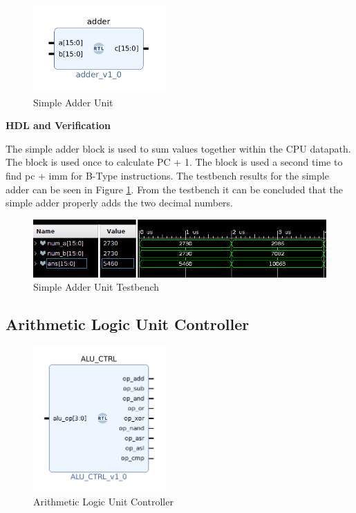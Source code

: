 \documentclass{article}
\newcommand{\stitle}{HDL and Verification}
\begin{document}
\begin{par}
	\begin{figure}[H]
		\centering
		\includegraphics[width=2in]{img/simpleAddr.png}
		\caption{Simple Adder Unit}
	\end{figure}
	
	\textbf{\stitle}
	\begin{par}
		The simple adder block is used to sum values together within the CPU datapath. The block is used once to calculate PC + 1. The block is used a second time to find pc + imm for B-Type instructions. The testbench results for the simple adder can be seen in Figure \ref{fig:addrfig}. From the testbench it can be concluded that the simple adder properly adds the two decimal numbers. 
	\end{par}
	
	\begin{figure}[H]
		\centering
		\includegraphics[width=7in]{img/simpleAddrTB.png}
		\caption{Simple Adder Unit Testbench}
		\label{fig:addrfig}
	\end{figure}

	\newpage

	\subsection{Arithmetic Logic Unit Controller}
	
	\begin{figure}[H]
		\centering
		\includegraphics[width=2in]{img/aluCtrl.png}
		\caption{Arithmetic Logic Unit Controller}
	\end{figure}


\end{par}
\end{document}
